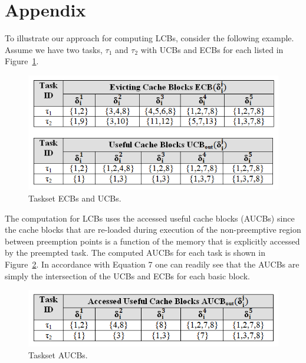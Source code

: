%
\clearpage
%
\section{Appendix}\label{sec:appendix}

To illustrate our approach for computing LCBs, consider the following example.  Assume we have two tasks, \begin{math}\tau_{1}\end{math} and \begin{math}\tau_{2}\end{math} with UCBs and ECBs for each listed in Figure~\ref{fig:taskset_ecbs_ucbs}.
\vspace{-5pt}
\begin{figure}[h!]
\begin{center}
\includegraphics[width=\linewidth]{taskset_ecbs_ucbs.png}
\caption{Taskset ECBs and UCBs.}
\label{fig:taskset_ecbs_ucbs}
\end{center}
\end{figure}
\vspace{-10pt}
\newline
\noindent
The computation for LCBs uses the accessed useful cache blocks (AUCBs) since the cache blocks that are re-loaded during execution of the non-preemptive region between preemption points is a function of the memory that is explicitly accessed by the preempted task.  The computed AUCBs for each task is shown in Figure~\ref{fig:taskset_aucbs}. In accordance with Equation 7 one can readily see that the AUCBs are simply the intersection of the UCBs and ECBs for each basic block.
\vspace{-10pt}
\begin{figure}[h!]
\begin{center}
\includegraphics[width=\linewidth]{taskset_aucbs.png}
\caption{Taskset AUCBs.}
\label{fig:taskset_aucbs}
\end{center}
\end{figure}
